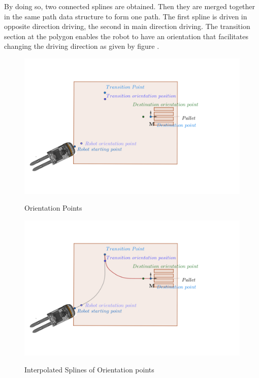 By doing so, two connected splines are obtained. Then they are merged together in the same path data structure to 
form one path. The first spline is driven in opposite direction driving, the second in main direction driving. 
The transition section at the polygon enables the robot to have an orientation that facilitates changing the driving direction
as given by figure .

\begin{figure}[H]
    \begin{center}
        \includegraphics[width=5in]{images/Chap2/Orientation_points.png}\\
        \caption{Orientation Points}
        \label{Orientation}
        \end{center}    
\end{figure}

\begin{figure}[H]
    \begin{center}
        \includegraphics[width=5in]{images/Chap2/Orientation_points_with_spline.png}\\
        \caption{Interpolated Splines of Orientation points}
        \label{Spline ori}
        \end{center}    
\end{figure}

